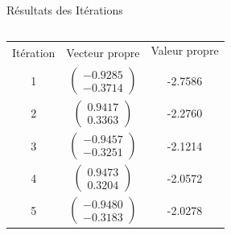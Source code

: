 \documentclass[french, 10pt]{beamer}
\theoremstyle{definition}
\begin{document}
\begin{frame}{Résultats des Itérations}
    \begin{columns}[T] %
        \begin{column}{0.5\textwidth}
            \scriptsize
            
            \begin{tabular}{|c|c|c|}
                \hline
                \multirow{2}{*}{Itération} & \multirow{2}{*}{Vecteur propre} & Valeur propre \\
                 & &  \\
                \hline
                1 & $\begin{pmatrix} -0.9285 \\ -0.3714 \end{pmatrix}$ & -2.7586 \\
                2 & $\begin{pmatrix} 0.9417 \\ 0.3363 \end{pmatrix}$ & -2.2760 \\
                3 & $\begin{pmatrix} -0.9457 \\ -0.3251 \end{pmatrix}$ & -2.1214 \\
                4 & $\begin{pmatrix} 0.9473 \\ 0.3204 \end{pmatrix}$ & -2.0572 \\
                5 & $\begin{pmatrix} -0.9480 \\ -0.3183 \end{pmatrix}$ & -2.0278 \\
                \hline
            \end{tabular}
        \end{column}

        \begin{column}{0.5\textwidth}
            \scriptsize
            

\end{column}
\end{columns}
\end{frame}
\end{document}
